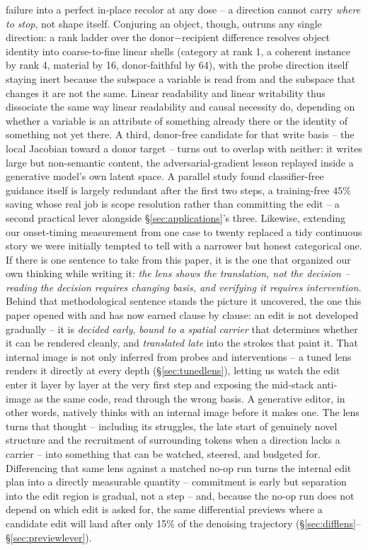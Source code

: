 \documentclass[10pt,twocolumn]{article}
\begin{document}
failure into a perfect in-place recolor at any dose -- a direction
cannot carry \emph{where to stop}, not shape itself. Conjuring
an object, though, outruns any single direction: a rank ladder over the
donor$-$recipient difference resolves object identity into
coarse-to-fine linear shells (category at rank 1, a coherent instance
by rank 4, material by 16, donor-faithful by 64), with the probe
direction itself staying inert because the subspace a variable is read
from and the subspace that changes it are not the same. Linear
readability and linear writability thus dissociate the same way linear
readability and causal necessity do, depending on whether a variable is
an attribute of something already there or the identity of something
not yet there. A
third, donor-free candidate for that write basis -- the local Jacobian
toward a donor target -- turns out to overlap with neither: it writes
large but non-semantic content, the adversarial-gradient lesson
replayed inside a generative model's own latent space. A
parallel study found classifier-free guidance itself is largely
redundant after the first two steps, a training-free $45\%$ saving whose
real job is scope resolution rather than committing the edit -- a second
practical lever alongside \S\ref{sec:applications}'s three. Likewise,
extending our onset-timing measurement from one case to twenty replaced a
tidy continuous story we were initially tempted to tell with a narrower
but honest categorical one. If there is one sentence to take from this
paper, it is the one that organized our own thinking while writing it:
\emph{the lens shows the translation, not the decision -- reading the
decision requires changing basis, and verifying it requires
intervention.} Behind that methodological sentence stands the picture
it uncovered, the one this paper opened with and has now earned clause
by clause: an edit is not developed gradually -- it is \emph{decided
early}, \emph{bound to a spatial carrier} that determines whether it
can be rendered cleanly, and \emph{translated late} into the strokes
that paint it. That internal image is not only inferred from probes
and interventions -- a tuned lens renders it directly at every depth
(\S\ref{sec:tunedlens}), letting us watch the edit enter it layer by
layer at the very first step and exposing the mid-stack anti-image as
the same code, read through the wrong basis. A generative editor, in
other words, natively thinks
with an internal image before it makes one. The lens turns that thought
-- including its struggles, the late start of genuinely novel structure
and the recruitment of surrounding tokens when a direction lacks a
carrier -- into something that can be watched, steered, and budgeted
for. Differencing that same lens against a matched no-op run turns the
internal edit plan into a directly measurable quantity -- commitment is
early but separation into the edit region is gradual, not a step --
and, because the no-op run does not depend on which edit is asked for,
the same differential previews where a candidate edit will land after
only 15\% of the denoising trajectory
(\S\ref{sec:difflens}--\S\ref{sec:previewlever}).
\end{document}
